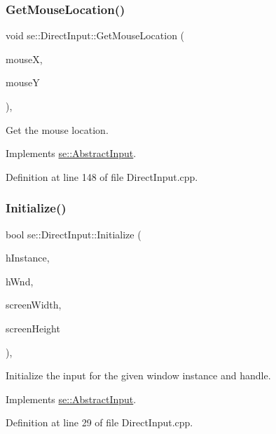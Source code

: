 \subsubsection{\texorpdfstring{Get\+Mouse\+Location()}{GetMouseLocation()}}
{\footnotesize\ttfamily void se\+::\+Direct\+Input\+::\+Get\+Mouse\+Location (\begin{DoxyParamCaption}\item[{int \&}]{mouseX,  }\item[{int \&}]{mouseY }\end{DoxyParamCaption})\hspace{0.3cm}{\ttfamily [override]}, {\ttfamily [virtual]}}

Get the mouse location. 

Implements \mbox{\hyperlink{classse_1_1_abstract_input_a93673fb3534be8bbc1f495f650064b91}{se\+::\+Abstract\+Input}}.



Definition at line 148 of file Direct\+Input.\+cpp.

\mbox{\label{classse_1_1_direct_input_ae8f8c4306ad58f7696548d2c63f01e6f}} 
\subsubsection{\texorpdfstring{Initialize()}{Initialize()}}
{\footnotesize\ttfamily bool se\+::\+Direct\+Input\+::\+Initialize (\begin{DoxyParamCaption}\item[{H\+I\+N\+S\+T\+A\+N\+CE}]{h\+Instance,  }\item[{H\+W\+ND}]{h\+Wnd,  }\item[{int}]{screen\+Width,  }\item[{int}]{screen\+Height }\end{DoxyParamCaption})\hspace{0.3cm}{\ttfamily [override]}, {\ttfamily [virtual]}}

Initialize the input for the given window instance and handle. 

Implements \mbox{\hyperlink{classse_1_1_abstract_input_a6219cdd66247d08f3ca52b2fea305b8d}{se\+::\+Abstract\+Input}}.



Definition at line 29 of file Direct\+Input.\+cpp.

